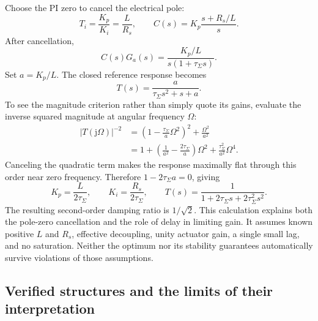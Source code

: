 Choose the PI zero to cancel the electrical pole:
\begin{equation}
 T_i=\frac{K_p}{K_i}=\frac{L}{R_s},
 \qquad
 C(s)=K_p\frac{s+R_s/L}{s}.
\end{equation}
After cancellation,
\begin{equation}
 C(s)G_a(s)=\frac{K_p/L}{s(1+\tau_\Sigma s)}.
\end{equation}
Set $a=K_p/L$. The closed reference response becomes
\begin{equation}
 T(s)=\frac{a}{\tau_\Sigma s^2+s+a}.
\end{equation}
To see the magnitude criterion rather than simply quote its gains, evaluate the inverse squared magnitude at angular frequency $\Omega$:
\begin{align}
 |T(\mathrm j\Omega)|^{-2}
 &=\left(1-\frac{\tau_\Sigma}{a}\Omega^2\right)^2
                    +\frac{\Omega^2}{a^2}\nonumber\\
 &=1+\left(\frac{1}{a^2}-\frac{2\tau_\Sigma}{a}\right)\Omega^2
                    +\frac{\tau_\Sigma^2}{a^2}\Omega^4.
\end{align}
Canceling the quadratic term makes the response maximally flat through this order near zero frequency. Therefore $1-2\tau_\Sigma a=0$, giving
\begin{equation}
 K_p=\frac{L}{2\tau_\Sigma},
 \qquad K_i=\frac{R_s}{2\tau_\Sigma},
 \qquad
 T(s)=\frac{1}{1+2\tau_\Sigma s+2\tau_\Sigma^2s^2}.
 \label{eq:control-ideal-magnitude}
\end{equation}
The resulting second-order damping ratio is $1/\sqrt{2}$. This calculation explains both the pole-zero cancellation and the role of delay in limiting gain. It assumes known positive $L$ and $R_s$, effective decoupling, unity actuator gain, a single small lag, and no saturation. Neither the optimum nor its stability guarantees automatically survive violations of those assumptions.

\subsection{Verified structures and the limits of their interpretation}

